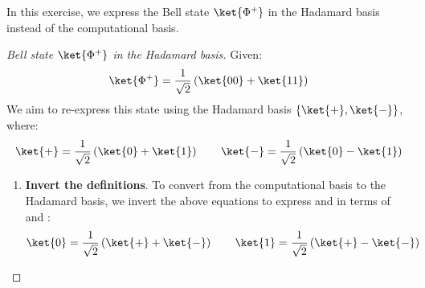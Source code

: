 \begin{examplebox}\label{example:bell-states-in-hadamard-basis}
    In this exercise, we express the Bell state $\ket{\Phi^{+}}$ in the Hadamard basis instead of the computational basis.

    \begin{proof}[Bell state $\ket{\Phi^{+}}$ in the Hadamard basis]
        Given:
        \begin{equation*}
            \ket{\Phi^{+}} = \dfrac{1}{\sqrt{2}}\left(\ket{00} + \ket{11}\right)
        \end{equation*}
        We aim to re-express this state using the Hadamard basis $\left\{\ket{+}, \ket{-}\right\}$, where:
        \begin{equation*}
            \ket{+} = \dfrac{1}{\sqrt{2}} \left(\ket{0} + \ket{1}\right)
            \qquad
            \ket{-} = \dfrac{1}{\sqrt{2}} \left(\ket{0} - \ket{1}\right)
        \end{equation*}
        \begin{enumerate}
            \item \textbf{Invert the definitions}. To convert from the computational basis to the Hadamard basis, we invert the above equations to express  and  in terms of \ket{+} and \ket{-}:
            \begin{equation*}
                \ket{0} = \dfrac{1}{\sqrt{2}} \left(\ket{+} + \ket{-}\right)
                \qquad
                \ket{1} = \dfrac{1}{\sqrt{2}} \left(\ket{+} - \ket{-}\right)
            \end{equation*}


\end{enumerate}
\end{proof}
\end{examplebox}
